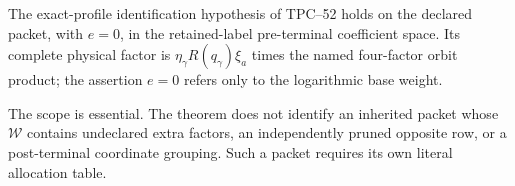 \begin{corollary}
\label{cor:tpc53-discharge-assumption}
The exact-profile identification hypothesis of TPC--52 holds on the
declared packet, with \(e=0\), in the retained-label pre-terminal
coefficient space.  Its complete physical factor is
\(\eta_\gamma R(q_\gamma)\xi_a\) times the named four-factor orbit
product; the assertion \(e=0\) refers only to the logarithmic base
weight.
\end{corollary}

The scope is essential.  The theorem does not identify an inherited
packet whose \(\mathcal W\) contains undeclared extra factors, an
independently pruned opposite row, or a post-terminal coordinate
grouping.  Such a packet requires its own literal allocation table.
